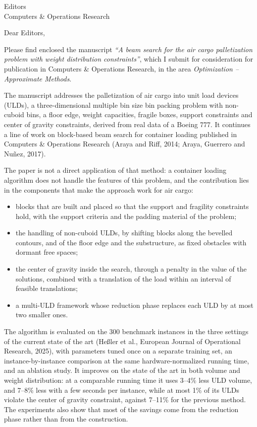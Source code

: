\documentclass[11pt]{letter}
\begin{document}
\begin{letter}{Editors\\Computers \& Operations Research}

\opening{Dear Editors,}

Please find enclosed the manuscript \emph{``A beam search for the air cargo palletization problem
with weight distribution constraints''}, which I submit for consideration for publication in
Computers \& Operations Research, in the area \emph{Optimization -- Approximate Methods}.

The manuscript addresses the palletization of air cargo into unit load devices (ULDs), a
three-dimensional multiple bin size bin packing problem with non-cuboid bins, a floor edge,
weight capacities, fragile boxes, support constraints and center of gravity constraints, derived
from real data of a Boeing 777. It continues a line of work on block-based beam search for
container loading published in Computers \& Operations Research (Araya and Riff, 2014; Araya,
Guerrero and Nu\~nez, 2017).

The paper is not a direct application of that method: a container loading algorithm does not
handle the features of this problem, and the contribution lies in the components that make the
approach work for air cargo:
\begin{itemize}
\item blocks that are built and placed so that the support and fragility constraints hold, with
	the support criteria and the padding material of the problem;
\item the handling of non-cuboid ULDs, by shifting blocks along the bevelled contours, and of the
	floor edge and the substructure, as fixed obstacles with dormant free spaces;
\item the center of gravity inside the search, through a penalty in the value of the solutions,
	combined with a translation of the load within an interval of feasible translations;
\item a multi-ULD framework whose reduction phase replaces each ULD by at most two smaller ones.
\end{itemize}

The algorithm is evaluated on the 300 benchmark instances in the three settings of the current
state of the art (He{\ss}ler et al., European Journal of Operational Research, 2025), with
parameters tuned once on a separate training set, an instance-by-instance comparison at the same
hardware-normalized running time, and an ablation study. It improves on the state of the art in
both volume and weight distribution: at a comparable running time it uses 3--4\% less ULD volume,
and 7--8\% less with a few seconds per instance, while at most 1\% of its ULDs violate the center
of gravity constraint, against 7--11\% for the previous method. The experiments also show that
most of the savings come from the reduction phase rather than from the construction.


\end{letter}
\end{document}

